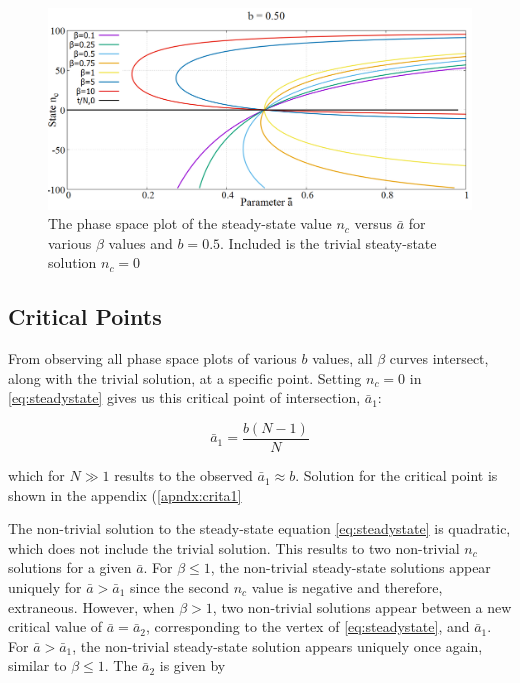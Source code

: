 \begin{figure}
 \centering
  \includegraphics[width=\linewidth]{images/chapter3/phaseSpace.png}
  \caption{The phase space plot of the steady-state value $n_{c}$ versus $\bar{a}$ for various $\beta$ values and $b = 0.5$. Included is the trivial steaty-state solution $n_{c} = 0$}
  \label{fig:phaseSpace}
\end{figure}



\subsection{Critical Points}

From observing all phase space plots of various $b$ values, all $\beta$ curves intersect, along with the trivial solution, at a specific point.
Setting $n_{c} = 0$ in \eqref{eq:steadystate} gives us this critical point of intersection, $\bar{a}_{1}$:

\begin{equation}
\bar{a}_{1} = \frac{b(N-1)}{N}
\end{equation}

which for $N\gg1$ results to the observed $\bar{a}_{1}\approx b$. Solution for the critical point is shown in the appendix (\ref{apndx:crita1}

The non-trivial solution to the steady-state equation \eqref{eq:steadystate} is quadratic, which does not include the trivial solution.
This results to two non-trivial $n_{c}$ solutions for a given $\bar{a}$.
For $\beta\leq1$, the non-trivial steady-state solutions appear uniquely for $\bar{a}>\bar{a}_{1}$ since the second $n_{c}$ value is negative and therefore, extraneous.
However, when $\beta>1$, two non-trivial solutions appear between a new critical value of $\bar{a}=\bar{a}_{2}$, corresponding to the vertex of \eqref{eq:steadystate}, and $\bar{a}_{1}$.
For $\bar{a}>\bar{a}_{1}$, the non-trivial steady-state solution appears uniquely once again, similar to $\beta\leq1$.
The $\bar{a}_{2}$ is given by

